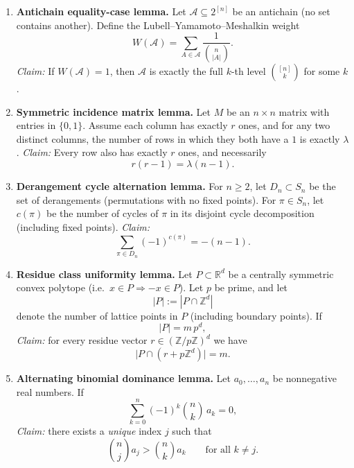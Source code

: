 \begin{enumerate}[label=\textbf{\arabic*.},leftmargin=*]

\item \textbf{Antichain equality-case lemma.}
Let $\mathcal{A}\subseteq 2^{[n]}$ be an antichain (no set contains another). Define the Lubell--Yamamoto--Meshalkin weight
\[
W(\mathcal{A})=\sum_{A\in\mathcal{A}}\frac{1}{\binom{n}{|A|}}.
\]
\emph{Claim:} If $W(\mathcal{A})=1$, then $\mathcal{A}$ is exactly the full $k$-th level $\binom{[n]}{k}$ for some $k$.

\item \textbf{Symmetric incidence matrix lemma.}
Let $M$ be an $n\times n$ matrix with entries in $\{0,1\}$. Assume each column has exactly $r$ ones, and for any two distinct columns, the number of rows in which they both have a $1$ is exactly $\lambda$.
\emph{Claim:} Every row also has exactly $r$ ones, and necessarily
\[
r(r-1)=\lambda(n-1).
\]

\item \textbf{Derangement cycle alternation lemma.}
For $n\ge 2$, let $D_n\subset S_n$ be the set of derangements (permutations with no fixed points). For $\pi\in S_n$, let $c(\pi)$ be the number of cycles of $\pi$ in its disjoint cycle decomposition (including fixed points).
\emph{Claim:}
\[
\sum_{\pi\in D_n} (-1)^{c(\pi)}=-(n-1).
\]

\item \textbf{Residue class uniformity lemma.}
Let $P\subset \mathbb{R}^d$ be a centrally symmetric convex polytope (i.e.\ $x\in P\Rightarrow -x\in P$). Let $p$ be prime, and let
\[
|P|:=|P\cap\mathbb{Z}^d|
\]
denote the number of lattice points in $P$ (including boundary points).
If
\[
|P|=m\,p^d,
\]
\emph{Claim:} for every residue vector $r\in(\mathbb{Z}/p\mathbb{Z})^d$ we have
\[
\bigl|P\cap (r+p\mathbb{Z}^d)\bigr|=m.
\]

\item \textbf{Alternating binomial dominance lemma.}
Let $a_0,\dots,a_n$ be nonnegative real numbers. If
\[
\sum_{k=0}^n (-1)^k \binom{n}{k}\,a_k=0,
\]
\emph{Claim:} there exists a \emph{unique} index $j$ such that
\[
\binom{n}{j}a_j>\binom{n}{k}a_k\qquad \text{for all }k\ne j.
\]

\end{enumerate}


